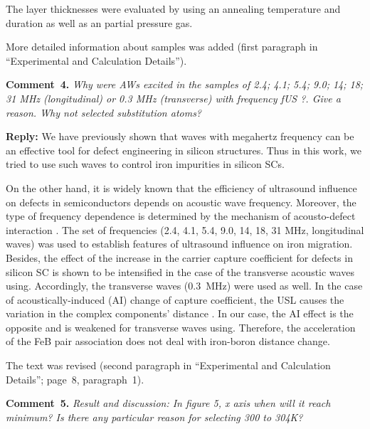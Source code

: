 \documentclass[sn-mathphys]{sn-jnl}
\begin{document}
The layer thicknesses were evaluated by using an annealing  temperature and duration as well as an partial pressure gas.

More detailed information about samples was added
(first paragraph in ``Experimental and Calculation Details'').


\vspace{1cm}
\noindent
\textcolor[rgb]{0.00,0.50,1.00}{\textbf{Comment~4.}}
\emph{Why were AWs excited in the samples of 2.4; 4.1; 5.4; 9.0; 14; 18; 31 MHz (longitudinal) or 0.3 MHz (transverse) with frequency fUS ?. Give a reason. Why not selected substitution atoms?}

\noindent
\textcolor[rgb]{0.51,0.00,0.00}{\textbf{Reply:}}
We have previously shown \cite{Olikh2018SM,Olikh2018JAP,OlikhJAP,GORB2020,Olikh:Ultras,Olikh:Ultras2016}
that waves with megahertz frequency can be an effective tool for defect engineering in silicon structures.
Thus in this work, we tried to use such waves to control iron impurities in silicon SCs.

On the other hand,
it is widely known that the efficiency of ultrasound influence on  defects in semiconductors depends on acoustic wave frequency.
Moreover, the type of frequency dependence is determined by the mechanism of acousto-defect
interaction \cite{Brailsford,Pavlovich,PeleshchakUJF2016}.
The set of frequencies (2.4, 4.1, 5.4, 9.0, 14, 18, 31 MHz, longitudinal waves)
was used to establish features of
ultrasound influence on iron migration.
Besides,  the effect of the increase in the carrier capture coefficient for defects in silicon SC
is shown \cite{Olikh2018SM} to be intensified in the case of the transverse acoustic waves using.
Accordingly, the transverse waves (0.3~MHz) were used as well.
In the case of acoustically-induced (AI) change of capture coefficient, the
USL causes the variation in the complex components' distance \cite{Olikh2018SM}.
 In our case, the AI effect is the opposite and is weakened for transverse waves using.
Therefore, the acceleration of the FeB pair association does not deal with iron-boron distance change.

The text was revised
(second paragraph in ``Experimental and Calculation Details'';
page~8, paragraph~1).


\vspace{1cm}
\noindent
\textcolor[rgb]{0.00,0.50,1.00}{\textbf{Comment~5.}}
\emph{Result and discussion: In figure 5, x axis when will it reach minimum? Is there any particular reason for selecting 300 to 304K?}
\end{document}
